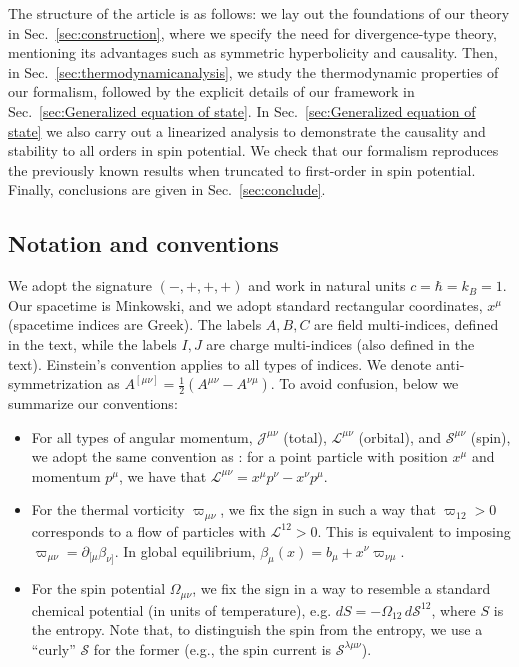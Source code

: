 \documentclass[12pt,aps,prd,nofootinbib,noshowkeys,noshowpacs,longbibliography,
superscriptaddress,tightenlines,floatfix,preprintnumbers]{revtex4-2}
\begin{document}
The structure of the article is as follows: we lay out the foundations of our theory in Sec.~\ref{sec:construction}, where we specify the need for divergence-type theory, mentioning its advantages such as symmetric hyperbolicity and causality. Then, in Sec.~\ref{sec:thermodynamicanalysis}, we study the thermodynamic properties of our formalism, followed by the explicit details of our framework in Sec.~\ref{sec:Generalized equation of state}. In Sec.~\ref{sec:Generalized equation of state} we also carry out a linearized analysis to demonstrate the causality and stability to all orders in spin potential. We check that our formalism reproduces the previously known results when truncated to first-order in spin potential. Finally, conclusions are given in Sec.~\ref{sec:conclude}.

\subsection{Notation and conventions}

We adopt the signature $(-,+,+,+)$ and work in natural units $c=\hbar=k_B=1$. Our spacetime is Minkowski, and we adopt standard rectangular coordinates, $x^\mu$ (spacetime indices are Greek). The labels $A,B,C$ are field multi-indices, defined in the text, while the labels $I,J$ are charge multi-indices (also defined in the text). Einstein's convention applies to all types of indices. 
We denote anti-symmetrization as $A^{[\mu\nu]}=\frac{1}{2}\left(A^{\mu\nu}-A^{\nu\mu}\right)$.
To avoid confusion, below we summarize our conventions:
\begin{itemize}
\item For all types of angular momentum, $\mathcal{J}^{\mu \nu}$ (total), $\mathcal{L}^{\mu \nu}$ (orbital), and $\mathcal{S}^{\mu \nu}$ (spin), we adopt the same convention as \cite{MTW_book,Speranza:2020ilk}: for a point particle with position $x^\mu$ and momentum $p^\mu$, we have that $\mathcal{L}^{\mu \nu}=x^\mu p^\nu-x^\nu p^\mu$.
\item For the thermal vorticity $\varpi_{\mu \nu}$, we fix the sign in such a way that $\varpi_{12}>0$ corresponds to a flow of particles with $\mathcal{L}^{12}>0$. This is equivalent to imposing $\varpi_{\mu \nu}=\partial_{[\mu} \beta_{\nu]}$. In global equilibrium, $\beta_\mu(x) =b_\mu +x^\nu \varpi_{\nu \mu}$.
\item For the spin potential $\Omega_{\mu \nu}$, we fix the sign in a way to resemble a standard chemical potential (in units of temperature), e.g. $dS = -\Omega_{12} \, d\mathcal{S}^{12}$, where $S$ is the entropy. Note that, to distinguish the spin from the entropy, we use a ``curly'' $\mathcal{S}$ for the former (e.g., the spin current is $\mathcal{S}^{\lambda \mu \nu}$). 
\end{itemize}
\end{document}
